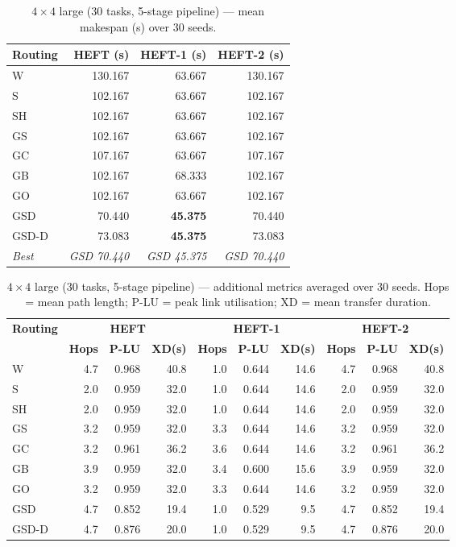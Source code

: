 \documentclass[11pt]{article}
\newcommand{\win}[1]{\textcolor{green!50!black}{\textbf{#1}}}
\newcommand{\bad}[1]{\textcolor{red!70!black}{#1}}
\begin{document}
\begin{table}[H]
\centering\small
\begin{tabular}{l r r r}
\toprule
\textbf{Routing} & \textbf{HEFT (s)} & \textbf{HEFT-1 (s)} & \textbf{HEFT-2 (s)} \\
\midrule
  W & \bad{130.167} & 63.667 & \bad{130.167} \\
  S & 102.167 & 63.667 & 102.167 \\
  SH & 102.167 & 63.667 & 102.167 \\
  GS & 102.167 & 63.667 & 102.167 \\
  GC & 107.167 & 63.667 & 107.167 \\
  GB & 102.167 & \bad{68.333} & 102.167 \\
  GO & 102.167 & 63.667 & 102.167 \\
  GSD & 70.440 & \win{45.375} & 70.440 \\
  GSD-D & 73.083 & \win{45.375} & 73.083 \\
\midrule
  \textit{Best} & \textit{GSD 70.440} & \textit{GSD 45.375} & \textit{GSD 70.440} \\
\bottomrule
\end{tabular}
\caption{$4\times4$ large (30 tasks, 5-stage pipeline) --- mean makespan (s) over 30 seeds.}
\end{table}

\begin{table}[H]
\centering\small
\begin{tabular}{l r r r r r r r r r}
\toprule
\textbf{Routing} & \multicolumn{3}{c}{\textbf{HEFT}} & \multicolumn{3}{c}{\textbf{HEFT-1}} & \multicolumn{3}{c}{\textbf{HEFT-2}} \\
\cmidrule(lr){2-4}\cmidrule(lr){5-7}\cmidrule(lr){8-10}
& \textbf{Hops} & \textbf{P-LU} & \textbf{XD(s)} & \textbf{Hops} & \textbf{P-LU} & \textbf{XD(s)} & \textbf{Hops} & \textbf{P-LU} & \textbf{XD(s)} \\
\midrule
  W & 4.7 & 0.968 & 40.8 & 1.0 & 0.644 & 14.6 & 4.7 & 0.968 & 40.8 \\
  S & 2.0 & 0.959 & 32.0 & 1.0 & 0.644 & 14.6 & 2.0 & 0.959 & 32.0 \\
  SH & 2.0 & 0.959 & 32.0 & 1.0 & 0.644 & 14.6 & 2.0 & 0.959 & 32.0 \\
  GS & 3.2 & 0.959 & 32.0 & 3.3 & 0.644 & 14.6 & 3.2 & 0.959 & 32.0 \\
  GC & 3.2 & 0.961 & 36.2 & 3.6 & 0.644 & 14.6 & 3.2 & 0.961 & 36.2 \\
  GB & 3.9 & 0.959 & 32.0 & 3.4 & 0.600 & 15.6 & 3.9 & 0.959 & 32.0 \\
  GO & 3.2 & 0.959 & 32.0 & 3.3 & 0.644 & 14.6 & 3.2 & 0.959 & 32.0 \\
  GSD & 4.7 & 0.852 & 19.4 & 1.0 & 0.529 & 9.5 & 4.7 & 0.852 & 19.4 \\
  GSD-D & 4.7 & 0.876 & 20.0 & 1.0 & 0.529 & 9.5 & 4.7 & 0.876 & 20.0 \\
\bottomrule
\end{tabular}
\caption{$4\times4$ large (30 tasks, 5-stage pipeline) --- additional metrics averaged over 30 seeds. Hops = mean path length; P-LU = peak link utilisation; XD = mean transfer duration.}
\end{table}
\end{document}
